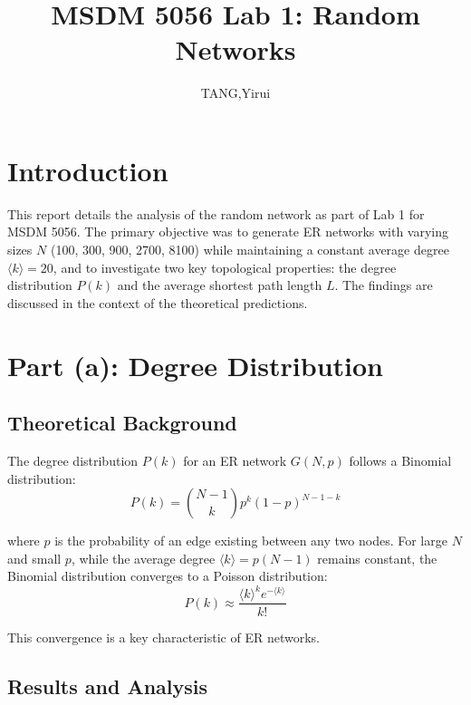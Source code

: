 \documentclass[11pt,a4paper]{article} %
\title{MSDM 5056 Lab 1: Random Networks}
\author{TANG,Yirui}
\date{} %
\begin{document}
\maketitle %

\section{Introduction}
\indent

This report details the analysis of the random network as part of Lab 1 for MSDM 5056. The primary objective was to generate ER networks with varying sizes $N$ (100, 300, 900, 2700, 8100) while maintaining a constant average degree $\langle k \rangle = 20$, and to investigate two key topological properties: the degree distribution $P(k)$ and the average shortest path length $L$. The findings are discussed in the context of the theoretical predictions.

\section{Part (a): Degree Distribution}

\subsection{Theoretical Background}
\indent

The degree distribution $P(k)$ for an ER network $G(N, p)$ follows a Binomial distribution:
\begin{equation}
    P(k) = \binom{N-1}{k} p^k (1-p)^{N-1-k}
\end{equation}

where $p$ is the probability of an edge existing between any two nodes. For large $N$ and small $p$, while the average degree $\langle k \rangle = p(N-1)$ remains constant, the Binomial distribution converges to a Poisson distribution:
\begin{equation}
    P(k) \approx \frac{\langle k \rangle^k e^{-\langle k \rangle}}{k!}
\end{equation}

This convergence is a key characteristic of ER networks.

\subsection{Results and Analysis}
\end{document}
